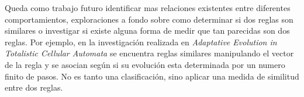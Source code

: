 Queda como trabajo futuro identificar mas relaciones existentes entre diferentes comportamientos, exploraciones a fondo sobre como determinar si dos reglas son similares o investigar si existe alguna forma de medir que tan parecidas son dos reglas. Por ejemplo, en la investigación realizada en \textit{Adaptative Evolution in Totalistic Cellular Automata} se encuentra reglas similares manipulando el vector de la regla y se asocian según si su evolución esta determinada por un numero finito de pasos. No es tanto una clasificación, sino aplicar una medida de similitud entre dos reglas.

 